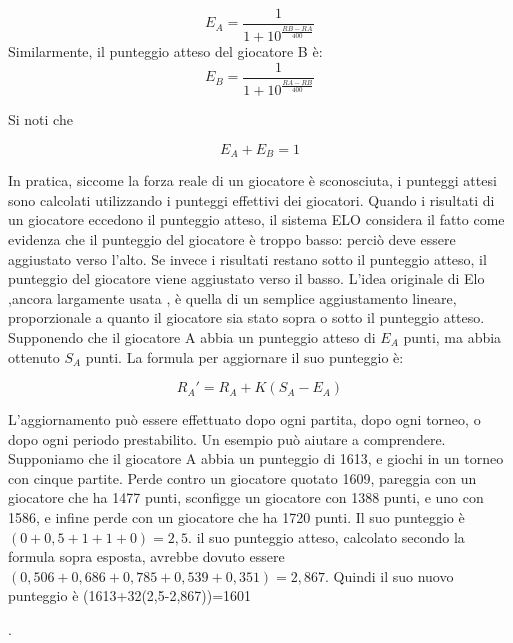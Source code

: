 \begin{equation}  E_{A}={\frac{{1}}{{1+10^\frac{{{RB} - {RA}}}{{400}}}}} \end{equation}
Similarmente, il punteggio atteso del giocatore B è:
\begin{equation}  E_{B}={\frac{{1}}{{1+10^\frac{{{RA} - {RB}}}{{400}}}}} \end{equation}

Si noti che {\begin{equation}E_{A} +  E_{B}=1 \end{equation}

In pratica, siccome la forza reale di un giocatore è sconosciuta, i punteggi attesi sono calcolati utilizzando i punteggi effettivi dei giocatori. Quando i risultati di un giocatore eccedono il punteggio atteso,
il sistema ELO considera il fatto come evidenza che il punteggio del giocatore è troppo basso: perciò deve essere aggiustato verso l'alto. Se invece i risultati restano sotto il punteggio atteso, 
il punteggio del giocatore viene aggiustato verso il basso. L'idea originale di Elo  ,ancora largamente usata , è quella di un semplice aggiustamento lineare, proporzionale a quanto il giocatore sia stato
sopra o sotto il punteggio atteso. 
Supponendo che il giocatore A abbia un punteggio atteso di ${E_{A}}$ punti, ma abbia ottenuto ${S_{A}}$ punti. La formula per aggiornare il suo punteggio è:

\begin{equation} R_{A}' =R_{A}+K(S_{A}-E_{A})\end{equation}

L'aggiornamento può essere effettuato dopo ogni partita, dopo ogni torneo, o dopo ogni periodo prestabilito. Un esempio può aiutare a comprendere. Supponiamo che il giocatore A abbia un punteggio di 1613, 
e giochi in un torneo con cinque partite. Perde contro un giocatore quotato 1609, pareggia con un giocatore che ha 1477 punti, sconfigge un giocatore con 1388 punti, e uno con 1586, e infine perde con un giocatore 
che ha 1720 punti. Il suo punteggio è $ {(0+0,5+1+1+0)=2,5}$. il suo punteggio atteso, calcolato secondo la formula sopra esposta, avrebbe dovuto essere 
$ (0,506+0,686+0,785+0,539+0,351)=2,867 $. Quindi il suo nuovo punteggio è (1613+32(2,5-2,867))=1601} \cite{itwiki:125247032}.

